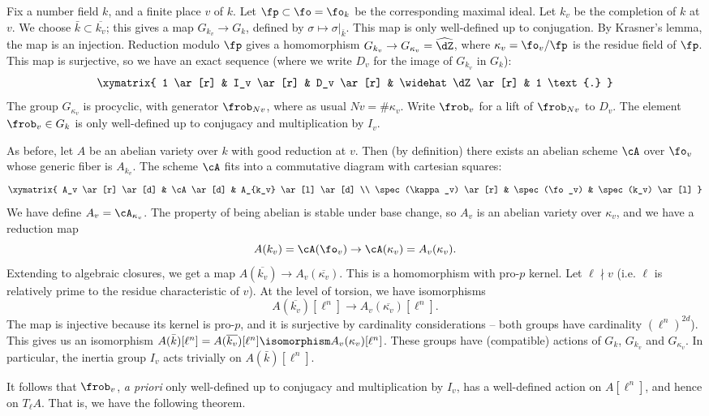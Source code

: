 Fix a number field $k$, and a finite place $v$ of $k$. Let 
$\fp\subset \fo=\fo_k$ be the corresponding maximal ideal. Let $k_v$ be the 
completion of $k$ at $v$. We choose $\bar k\subset \overline{k_v}$; this gives 
a map $G_{k_v} \to G_k$, defined by $\sigma\mapsto \sigma|_{\bar k}$. This map 
is only well-defined up to conjugation. By Krasner's lemma, the map is an 
injection. Reduction modulo $\fp$ gives a homomorphism 
$G_{k_v} \to G_{\kappa_v}=\widehat\dZ$, where $\kappa_v = \fo_v/\fp$ is the 
residue field of $\fp$. This map is surjective, so we have an exact sequence 
(where we write $D_v$ for the image of $G_{k_v}$ in $G_k$):
\[\xymatrix{
  1 \ar[r] 
    & I_v \ar[r] 
    & D_v \ar[r] 
    & \widehat\dZ \ar[r] 
    & 1 \text{.}
}\]
The group $G_{\kappa_v}$ is procyclic, with generator 
$\frob_{N v}$, where as usual $N v = \# \kappa_v$. Write $\frob_v$ for a lift 
of $\frob_{N v}$ to $D_v$. The element $\frob_v\in G_k$ is only well-defined up 
to conjugacy and multiplication by $I_v$. 

As before, let $A$ be an abelian variety over $k$ with good reduction at $v$. 
Then (by definition) there exists an abelian scheme $\cA$ over $\fo_v$ whose 
generic fiber is $A_{k_v}$. The scheme $\cA$ fits into a commutative diagram 
with cartesian squares: 
\[\xymatrix{
  A_v \ar[r] \ar[d] 
    & \cA \ar[d] 
    & A_{k_v} \ar[l] \ar[d] \\
  \spec(\kappa_v) \ar[r] 
    & \spec(\fo_v) 
    & \spec(k_v) \ar[l] 
}\]
We have define $A_v=\cA_{\kappa_v}$. The property of being abelian is stable 
under base change, so $A_v$ is an abelian variety over $\kappa_v$, and we have 
a reduction map 
\[
  A(k_v) = \cA(\fo_v) \to \cA(\kappa_v) = A_v(\kappa_v) \text{.}
\]
Extending to algebraic closures, we get a map 
$A(\overline{k_v}) \to A_v(\overline{\kappa_v})$. This is a homomorphism with 
pro-$p$ kernel. Let $\ell\nmid v$ (i.e. $\ell$ is relatively prime to the 
residue characteristic of $v$). At the level of torsion, we have isomorphisms 
\[
  A(\overline{k_v})[\ell^n] \to A_v(\overline{\kappa_v})[\ell^n] \text{.}
\]
The map is injective because its kernel is pro-$p$, and it is surjective by 
cardinality considerations -- both groups have cardinality $(\ell^n)^{2 d}$). 
This gives us an isomorphism 
$A(\bar k)[\ell^n] = A(\overline{k_v})[\ell^n]\isomorphism A_v(\kappa_v)[\ell^n]$. 
These groups have (compatible) actions of $G_k$, $G_{k_v}$ and $G_{\kappa_v}$. In 
particular, the inertia group $I_v$ acts trivially on $A(\bar k)[\ell^n]$. 

It follows that $\frob_v$, \emph{a priori} only well-defined up to conjugacy 
and multiplication by $I_v$, has a well-defined action on $A[\ell^n]$, and 
hence on $T_\ell A$. That is, we have the following theorem. 

